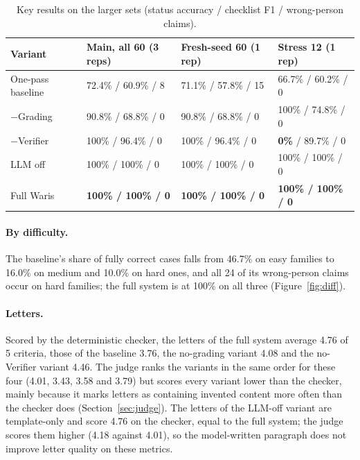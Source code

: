 \documentclass[12pt,a4paper,oneside]{report}
\begin{document}
\begin{table}[H]
\centering\small{}
\caption[Key results on the larger sets]{Key results on the larger sets (status accuracy / checklist F1 / wrong-person claims).}\label{tab:sets}
\renewcommand{\arraystretch}{1.1}
\begin{tabularx}{\linewidth}{@{}p{3.3cm}XXX@{}}
\toprule
\textbf{Variant} & \textbf{Main, all 60 (3 reps)} & \textbf{Fresh-seed 60 (1 rep)} & \textbf{Stress 12 (1 rep)} \\ \midrule
One-pass baseline & 72.4\% / 60.9\% / 8 & 71.1\% / 57.8\% / 15 & 66.7\% / 60.2\% / 0 \\
$-$Grading & 90.8\% / 68.8\% / 0 & 90.8\% / 68.8\% / 0 & 100\% / 74.8\% / 0 \\
$-$Verifier & 100\% / 96.4\% / 0 & 100\% / 96.4\% / 0 & \textbf{0\%} / 89.7\% / 0 \\
LLM off & 100\% / 100\% / 0 & 100\% / 100\% / 0 & 100\% / 100\% / 0 \\
Full Waris & \textbf{100\% / 100\% / 0} & \textbf{100\% / 100\% / 0} & \textbf{100\% / 100\% / 0} \\ \bottomrule
\end{tabularx}
\end{table}

\paragraph{By difficulty.} The baseline's share of fully correct cases falls from 46.7\% on easy families to 16.0\% on medium and 10.0\% on hard ones, and all 24 of its wrong-person claims occur on hard families; the full system is at 100\% on all three (Figure~\ref{fig:diff}).

\paragraph{Letters.} Scored by the deterministic checker, the letters of the full system average 4.76 of 5 criteria, those of the baseline 3.76, the no-grading variant 4.08 and the no-Verifier variant 4.46. The judge ranks the variants in the same order for these four (4.01, 3.43, 3.58 and 3.79) but scores every variant lower than the checker, mainly because it marks letters as containing invented content more often than the checker does (Section~\ref{sec:judge}). The letters of the LLM-off variant are template-only and score 4.76 on the checker, equal to the full system; the judge scores them higher (4.18 against 4.01), so the model-written paragraph does not improve letter quality on these metrics.
\end{document}
